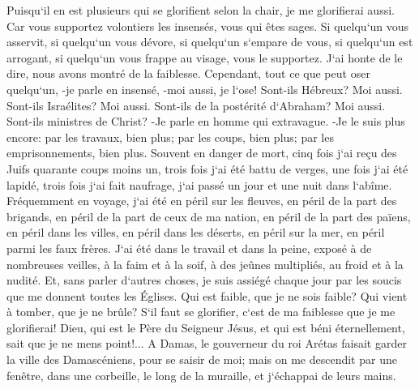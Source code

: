 \verse Puisqu`il en est plusieurs qui se glorifient selon la chair, je me glorifierai aussi. 
\verse Car vous supportez volontiers les insensés, vous qui êtes sages. 
\verse Si quelqu`un vous asservit, si quelqu`un vous dévore, si quelqu`un s`empare de vous, si quelqu`un est arrogant, si quelqu`un vous frappe au visage, vous le supportez. 
\verse J`ai honte de le dire, nous avons montré de la faiblesse. Cependant, tout ce que peut oser quelqu`un, -je parle en insensé, -moi aussi, je l`ose! 
\verse Sont-ils Hébreux? Moi aussi. Sont-ils Israélites? Moi aussi. Sont-ils de la postérité d`Abraham? Moi aussi. 
\verse Sont-ils ministres de Christ? -Je parle en homme qui extravague. -Je le suis plus encore: par les travaux, bien plus; par les coups, bien plus; par les emprisonnements, bien plus. Souvent en danger de mort, 
\verse cinq fois j`ai reçu des Juifs quarante coups moins un, 
\verse trois fois j`ai été battu de verges, une fois j`ai été lapidé, trois fois j`ai fait naufrage, j`ai passé un jour et une nuit dans l`abîme. 
\verse Fréquemment en voyage, j`ai été en péril sur les fleuves, en péril de la part des brigands, en péril de la part de ceux de ma nation, en péril de la part des païens, en péril dans les villes, en péril dans les déserts, en péril sur la mer, en péril parmi les faux frères. 
\verse J`ai été dans le travail et dans la peine, exposé à de nombreuses veilles, à la faim et à la soif, à des jeûnes multipliés, au froid et à la nudité. 
\verse Et, sans parler d`autres choses, je suis assiégé chaque jour par les soucis que me donnent toutes les Églises. 
\verse Qui est faible, que je ne sois faible? Qui vient à tomber, que je ne brûle? 
\verse S`il faut se glorifier, c`est de ma faiblesse que je me glorifierai! 
\verse Dieu, qui est le Père du Seigneur Jésus, et qui est béni éternellement, sait que je ne mens point!... 
\verse A Damas, le gouverneur du roi Arétas faisait garder la ville des Damascéniens, pour se saisir de moi; 
\verse mais on me descendit par une fenêtre, dans une corbeille, le long de la muraille, et j`échappai de leurs mains. 

\chapter{}

